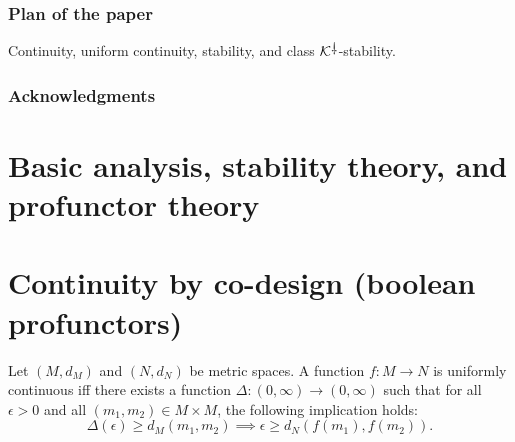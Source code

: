 \documentclass[11pt, one side, article]{memoir}
\theoremstyle{definition}
\theoremstyle{plain}
\newcommand{\cat}[1]{\mathcal{#1}}%
\newcommand{\ldag}{^{\rotatebox{180}{$\dagger$}}}
\newcommand{\K}{\cat{K}}
\newcommand{\Kdag}[1][0]{\K\ldag}
\begin{document}
\subsection{Plan of the paper}

Continuity, 
uniform continuity, 
stability, and
class $\Kdag$-stability.

\subsection*{Acknowledgments}



\chapter{Basic analysis, stability theory, and profunctor theory}
\label{chap.stability_and_profunctors}


\chapter{Continuity by co-design (boolean profunctors)}
\label{}

Let $(M,d_M)$ and $(N,d_N)$ be metric spaces. A function $f\colon M\to N$ is uniformly continuous iff there exists a function $\Delta\colon(0,\infty)\to(0,\infty)$ such that for all $\epsilon>0$ and all $(m_1,m_2)\in M\times M$, the following implication holds:
\[
\Delta(\epsilon)\geq d_M(m_1,m_2)\implies
\epsilon\geq d_N(f(m_1),f(m_2)).
\]
\end{document}
